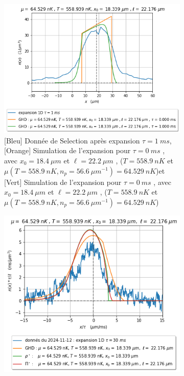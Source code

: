 \documentclass[a3, 10pt,twoside]{article}          %
\theoremstyle{plain}
\theoremstyle{definition}
\theoremstyle{remark}
\theoremstyle{definition} %
\begin{document}
	\begin{figure}[h]
			\begin{subfigure}[b]{0.45\textwidth}
        		\centering
        		\includegraphics[width=\textwidth]{Figures/simul_expansion_1_22}
        		\caption{{\color{blue}[Bleu] Donnée de Selection après expansion $\tau = 1~ms$},{\color{orange}[Orange]  Simulation de l'expansion pour $\tau= 0~ms$  , avec $x_0 = 18.4~\mu m$ et $\ell = 22.2~\mu m$ , ($T = 558.9 ~nK$ et $\mu( T = 558.9 ~nK , n_p = 56.6 ~{\mu m}^{-1} )= 64.529~nK$)}et {\color{OliveGreen}[Vert]  Simulation de l'expansion pour $\tau= 0~ms$  , avec $x_0 = 18.4~\mu m$ et $\ell = 22.2~\mu m$ , ($T = 558.9 ~nK$ et $\mu( T = 558.9 ~nK , n_p = 56.6 ~{\mu m}^{-1} )= 64.529~nK$)}   }
        		\label{fig:expansion_1_22}
    		\end{subfigure}
    		\hfill
    		\begin{subfigure}[b]{0.45\textwidth}
        		\centering
        		\includegraphics[width=\textwidth]{Figures/simul_expansion_30_22}

\end{subfigure}
\end{figure}
\end{document}
